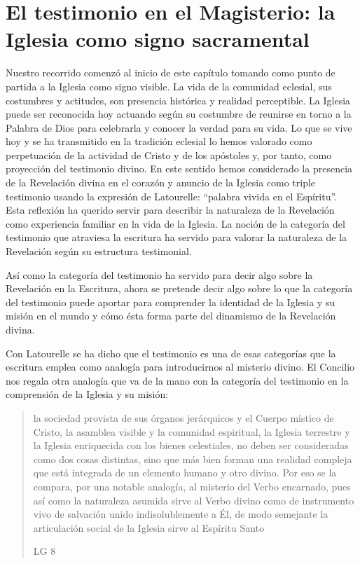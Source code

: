 \section{El testimonio en el Magisterio: la Iglesia como signo sacramental}

Nuestro recorrido comenzó al inicio de este capítulo tomando como punto de
partida a la Iglesia como signo visible. La vida de la comunidad eclesial, sus
costumbres y actitudes, son presencia histórica y realidad perceptible. La
Iglesia puede ser reconocida hoy actuando según su costumbre de reunirse en
torno a la Palabra de Dios para celebrarla y conocer la verdad para su vida. Lo
que se vive hoy y se ha transmitido en la tradición eclesial lo hemos valorado
como perpetuación de la actividad de Cristo y de los apóstoles y, por tanto,
como proyección del testimonio divino. En este sentido hemos considerado la
presencia de la Revelación divina en el corazón y anuncio de la Iglesia como
triple testimonio usando la expresión de Latourelle: \enquote{palabra vivida en
  el Espíritu}. Esta reflexión ha querido servir para describir la naturaleza de
la Revelación como experiencia familiar en la vida de la Iglesia. La noción de
la categoría del testimonio que atraviesa la escritura ha servido para valorar
la naturaleza de la Revelación según su estructura testimonial.

Así como la categoría del testimonio ha servido para decir algo sobre la
Revelación en la Escritura, ahora se pretende decir algo sobre lo que la
categoría del testimonio puede aportar para comprender la identidad de la
Iglesia y su misión en el mundo y cómo ésta forma parte del dinamismo de la
Revelación divina.

Con Latourelle se ha dicho que el testimonio es una de esas categorías que la
escritura emplea como analogía para introducirnos al misterio divino. El
Concilio nos regala otra analogía que va de la mano con la categoría del
testimonio en la comprensión de la Iglesia y su misión:
\blockquote[LG 8]{la sociedad provista de sus órganos jerárquicos y el Cuerpo
  místico de Cristo, la asamblea visible y la comunidad espiritual, la Iglesia
  terrestre y la Iglesia enriquecida con los bienes celestiales, no deben ser
  consideradas como dos cosas distintas, sino que más bien forman una realidad
  compleja que está integrada de un elemento humano y otro divino. Por eso se la
  compara, por una notable analogía, al misterio del Verbo encarnado, pues así
  como la naturaleza asumida sirve al Verbo divino como de instrumento vivo de
  salvación unido indisolublemente a Él, de modo semejante la articulación
  social de la Iglesia sirve al Espíritu Santo}

